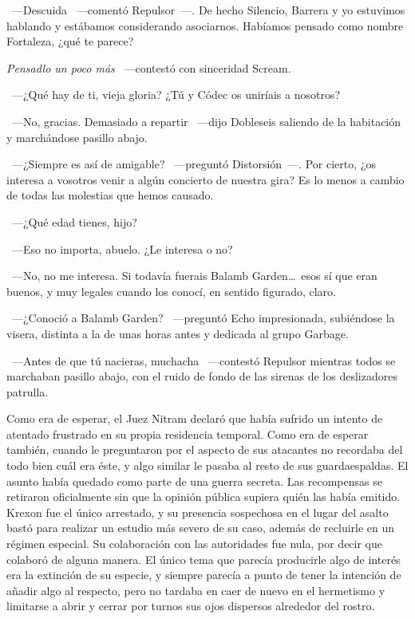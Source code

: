 ~---Descuida ~---comentó Repulsor~---. De hecho Silencio, Barrera y yo estuvimos hablando y estábamos considerando asociarnos. Habíamos pensado como nombre Fortaleza, ¿qué te parece?

\emph{Pensadlo un poco más} ~---contestó con sinceridad Scream.

~---¿Qué hay de ti, vieja gloria? ¿Tú y Códec os uniríais a nosotros?

~---No, gracias. Demasiado a repartir ~---dijo Dobleseis saliendo de la habitación y marchándose pasillo abajo.

~---¿Siempre es así de amigable? ~---preguntó Distorsión~---. Por cierto, ¿os interesa a vosotros venir a algún concierto de nuestra gira? Es lo menos a cambio de todas las molestias que hemos causado.

~---¿Qué edad tienes, hijo?

~---Eso no importa, abuelo. ¿Le interesa o no?

~---No, no me interesa. Si todavía fuerais Balamb Garden\dots\ esos sí que eran buenos, y muy legales cuando los conocí, en sentido figurado, claro.

~---¿Conoció a Balamb Garden? ~---preguntó Echo impresionada, subiéndose la visera, distinta a la de unas horas antes y dedicada al grupo Garbage.

~---Antes de que tú nacieras, muchacha ~---contestó Repulsor mientras todos se marchaban pasillo abajo, con el ruido de fondo de las sirenas de los deslizadores patrulla.

\parbreak
Como era de esperar, el Juez Nitram declaró que había sufrido un intento de atentado frustrado en su propia residencia temporal. Como era de esperar también, cuando le preguntaron por el aspecto de sus atacantes no recordaba del todo bien cuál era éste, y algo similar le pasaba al resto de sus guardaespaldas. El asunto había quedado como parte de una guerra secreta. Las recompensas se retiraron oficialmente sin que la opinión pública supiera quién las había emitido. Krexon fue el único arrestado, y su presencia sospechosa en el lugar del asalto bastó para realizar un estudio más severo de su caso, además de recluirle en un régimen especial. Su colaboración con las autoridades fue nula, por decir que colaboró de alguna manera. El único tema que parecía producirle algo de interés era la extinción de su especie, y siempre parecía a punto de tener la intención de añadir algo al respecto, pero no tardaba en caer de nuevo en el hermetismo y limitarse a abrir y cerrar por turnos sus ojos dispersos alrededor del rostro.

